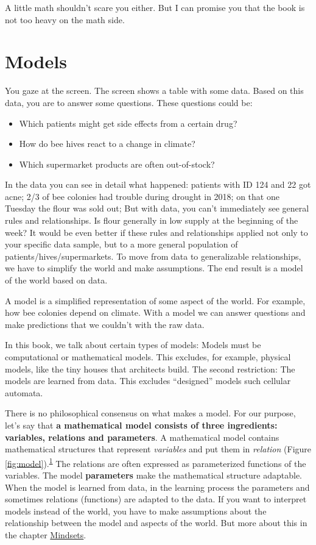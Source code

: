 \documentclass[
  10pt,
]{scrbook}
\providecommand{\tightlist}{%
  \setlength{\itemsep}{0pt}\setlength{\parskip}{0pt}}
\begin{document}
A little math shouldn't scare you either.
But I can promise you that the book is not too heavy on the math side.

\mainmatter

\hypertarget{models}{%
\chapter{Models}\label{models}}

You gaze at the screen.
The screen shows a table with some data.
Based on this data, you are to answer some questions.
These questions could be:

\begin{itemize}
\tightlist
\item
  Which patients might get side effects from a certain drug?
\item
  How do bee hives react to a change in climate?
\item
  Which supermarket products are often out-of-stock?
\end{itemize}

In the data you can see in detail what happened: patients with ID 124 and 22 got acne; 2/3 of bee colonies had trouble during drought in 2018; on that one Tuesday the flour was sold out;
But with data, you can't immediately see general rules and relationships.
Is flour generally in low supply at the beginning of the week?
It would be even better if these rules and relationships applied not only to your specific data sample, but to a more general population of patients/hives/supermarkets.
To move from data to generalizable relationships, we have to simplify the world and make assumptions.
The end result is a model of the world based on data.

A model is a simplified representation of some aspect of the world.
For example, how bee colonies depend on climate.
With a model we can answer questions and make predictions that we couldn't with the raw data.

In this book, we talk about certain types of models:
Models must be computational or mathematical models.
This excludes, for example, physical models, like the tiny houses that architects build.
The second restriction: The models are learned from data.
This excludes ``designed'' models such cellular automata.

There is no philosophical consensus on what makes a model.
For our purpose, let's say that \textbf{a mathematical model consists of three ingredients: variables, relations and parameters}.
A mathematical model contains mathematical structures that represent \emph{variables} and put them in \emph{relation} (Figure \ref{fig:model}).\textsuperscript{\protect\hyperlink{ref-weisberg2012simulation}{1}}
The relations are often expressed as parameterized functions of the variables.
The model \textbf{parameters} make the mathematical structure adaptable.
When the model is learned from data, in the learning process the parameters and sometimes relations (functions) are adapted to the data.
If you want to interpret models instead of the world, you have to make assumptions about the relationship between the model and aspects of the world.
But more about this in the chapter \protect\hyperlink{mindsets}{Mindsets}.
\end{document}

